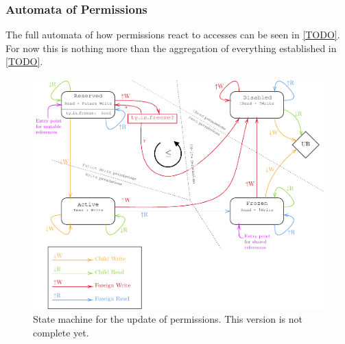 \documentclass[a4paper,11pt]{article}
\theoremstyle{plain}
\theoremstyle{definition}
\theoremstyle{remark}
\begin{document}
\subsubsection{Automata of Permissions}

The full automata of how permissions react to accesses can be seen in \ref{TODO}.
For now this is nothing more than the aggregation of everything established in \ref{TODO}.

\begin{figure}
    \includegraphics[width=\textwidth]{../figs/state-machine_noprotect.pdf}
    \caption{State machine for the update of permissions. This version is not complete yet.}
    \label{fig:state-machine-noprotect}
\end{figure}
\end{document}
